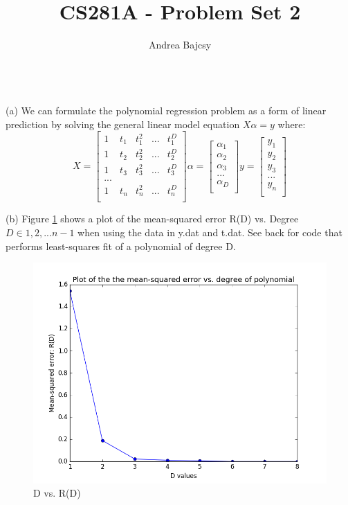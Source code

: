 \documentclass[11pt]{article}
\newenvironment{problem}[2][Problem]{\begin{trivlist}
\item[\hskip \labelsep {\bfseries #1}\hskip \labelsep {\bfseries #2.}]}{\end{trivlist}}
\begin{document}
 
\title{CS281A - Problem Set 2}
\author{Andrea Bajcsy}
 
\maketitle
 
\begin{problem}{2.1}
\text{ }\\

(a) We can formulate the polynomial regression problem as a form of linear prediction by solving the general linear model equation $X\alpha = y$ where:
\\
\[
X=
  \begin{bmatrix}
    1 & t_{1} & t^2_{1} & ... & t^D_{1}\\
    1 & t_{2} & t^2_{2} & ... & t^D_{2}\\
    1 & t_{3} & t^2_{3} & ... & t^D_{3}\\
    ...\\
    1 & t_{n} & t^2_{n} & ... & t^D_{n}\\
  \end{bmatrix}
\alpha=
	\begin{bmatrix}
		\alpha_{1}\\
		\alpha_{2}\\
		\alpha_{3}\\
		...\\
		\alpha_{D}\\
	 \end{bmatrix}
y=
	\begin{bmatrix}
		y_{1}\\
		y_{2}\\
		y_{3}\\
		...\\
		y_{n}\\
	 \end{bmatrix}
\]

(b) Figure \ref{fig:2b} shows a plot of the mean-squared error R(D) vs. Degree $D \in {1,2,...n-1}$ when using the data in y.dat and t.dat. See back for code that performs least-squares fit of a polynomial of degree D. 
\begin{figure}[h!]
  \centering
  \includegraphics[scale=0.5]{figs/2b.png}
  \caption{D vs. R(D)}
  \label{fig:2b}
\end{figure}


\end{problem}
\end{document}
